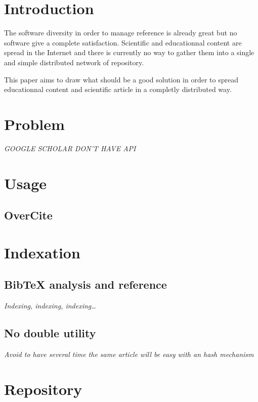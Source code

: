 \section{Introduction}

The software diversity in order to manage reference is already 
great but no software give a complete satisfaction. Scientific and
educationnal content are spread in the Internet and there is currently
no way to gather them into a single and simple distributed network of repository.

This paper aims to draw what should be a good solution in order to 
spread educationnal content and scientific article in a completly distributed 
way.


\section{Problem}

\textit{GOOGLE SCHOLAR DON'T HAVE API}

\section{Usage}

\subsection{OverCite}

\section{Indexation}


\subsection{Bib\TeX{} analysis and reference}

\textit{Indexing, indexing, indexing\ldots}

\subsection{No double utility}

\textit{Avoid to have several time the same article will
be easy with an hash mechanism}

\section{Repository}

